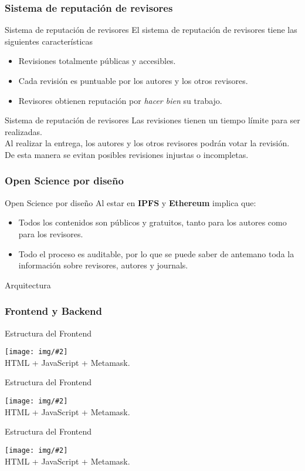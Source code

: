 \documentclass{beamer}
\newcommand{\framein}[3]{
  \begin{frame}{#1}
    \begin{center}
      \texttt{[image: img/\#2]}\\
      #3.
    \end{center}
  \end{frame}
}
\newcommand{\framet}[3]{
  \begin{frame}{#1}
    #2
  \end{frame}
}
\begin{document}
\subsubsection{Sistema de reputación de revisores}
\framet{Sistema de reputación de revisores}{El sistema de reputación de revisores tiene las siguientes características
\begin{itemize}
    \item Revisiones totalmente públicas y accesibles.
    \item Cada revisión es puntuable por los autores y los otros revisores.
    \item Revisores obtienen reputación por \emph{hacer bien} su trabajo.
\end{itemize}
}

\framet{Sistema de reputación de revisores}{
Las revisiones tienen un tiempo límite para ser realizadas.\\
 \vfill
Al realizar la entrega, los autores y los otros revisores podrán votar la
revisión.\\
\vfill
De esta manera se evitan posibles revisiones injustas o incompletas.
}

\subsubsection{Open Science por diseño}


\framet{Open Science por diseño}{Al estar en \textbf{IPFS} y \textbf{Ethereum}
  implica que:
  \begin{itemize}
  \item Todos los contenidos son públicos y gratuitos, tanto para los autores como
    para los revisores.
  \item Todo el proceso es auditable, por lo que se puede saber de antemano toda
    la información sobre revisores, autores y journals.
  \end{itemize}}



\subsection{Arquitectura}

\subsubsection{Frontend y Backend}

\framein{Estructura del Frontend}{homepage.png}{HTML + JavaScript + Metamask}
\framein{Estructura del Frontend}{topic.png}{HTML + JavaScript + Metamask}
\framein{Estructura del Frontend}{rating.png}{HTML + JavaScript + Metamask}
\end{document}
